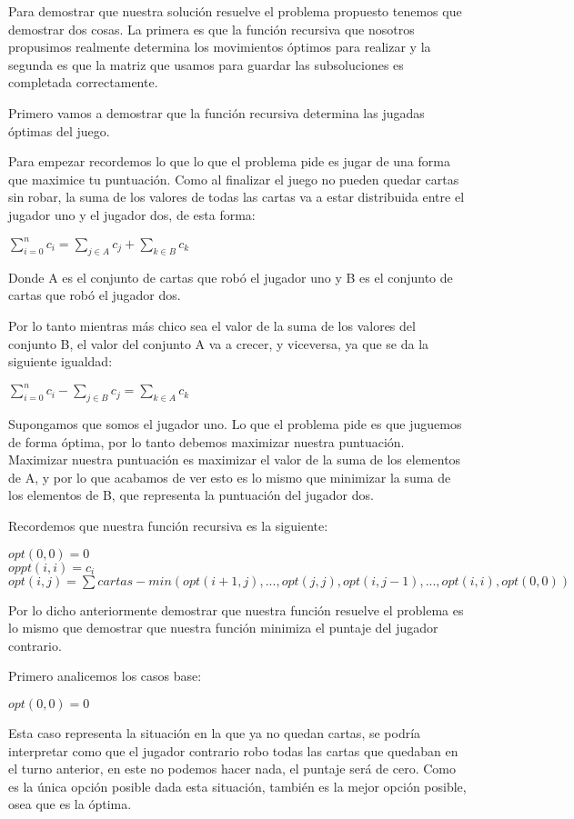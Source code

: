 Para demostrar que nuestra solución resuelve el problema propuesto tenemos que demostrar dos cosas. La primera es que la función recursiva que nosotros propusimos realmente determina los movimientos óptimos para realizar y la segunda es que la matriz que usamos para guardar las subsoluciones es completada correctamente.

Primero vamos a demostrar que la función recursiva determina las jugadas óptimas del juego. 

Para empezar recordemos lo que lo que el problema pide es jugar de una forma que maximice tu puntuación. Como al finalizar el juego no pueden quedar cartas sin robar, la suma de los valores de todas las cartas va a estar distribuida entre el jugador uno y el jugador dos, de esta forma:

$\sum_{i=0}^{n} c_i = \sum_{j \in A} c_j + \sum_{k \in B} c_k$

Donde A es el conjunto de cartas que robó el jugador uno y B es el conjunto de cartas que robó el jugador dos.

Por lo tanto mientras más chico sea el valor de la suma de los valores del conjunto B, el valor del conjunto A va a crecer, y viceversa, ya que se da la siguiente igualdad:

$\sum_{i=0}^{n} c_i  - \sum_{j \in B} c_j= \sum_{k \in A} c_k$

Supongamos que somos el jugador uno. Lo que el problema pide es que juguemos de forma óptima, por lo tanto debemos maximizar nuestra puntuación. Maximizar nuestra puntuación es maximizar el valor de la suma de los elementos de A, y  por lo que acabamos de ver esto es lo mismo que minimizar la suma de los elementos de B, que representa la puntuación del jugador dos.

Recordemos que nuestra función recursiva es la siguiente:

$opt(0,0) = 0$ \\
$oppt(i,i) = c_i$ \\
$opt(i,j) = \sum cartas - min(opt(i+1, j), ..., opt(j,j), opt(i, j-1), ... ,opt(i,i), opt(0,0))$

Por lo dicho anteriormente demostrar que nuestra función resuelve el problema es lo mismo que demostrar que nuestra función minimiza el puntaje del jugador contrario.

Primero analicemos los casos base:

$opt(0,0) = 0$

Esta caso representa la situación en la que ya no quedan cartas, se podría interpretar como que el jugador contrario robo todas las cartas que quedaban en el turno anterior, en este no podemos hacer nada, el puntaje será de cero. Como es la única opción posible dada esta situación, también es la mejor opción posible, osea que es la óptima.

